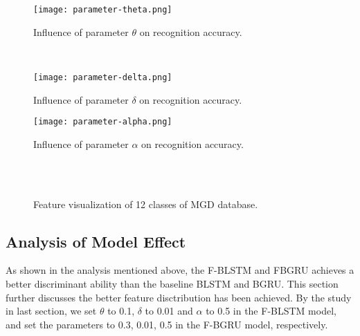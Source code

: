 \documentclass[review]{elsarticle}
\begin{document}
	\begin{figure*}[htp]
	\normalsize
	\begin{minipage}[t]{\linewidth}
		\centering
		\texttt{[image: parameter-theta.png]}
		\caption{Influence of parameter $\theta$ on recognition accuracy.}
		\label{fig:parameter-theta}
	\end{minipage}
	\hfill \\
	\begin{minipage}[h]{\linewidth}
		\centering
		\texttt{[image: parameter-delta.png]}
		\caption{Influence of parameter $\delta$ on recognition accuracy.}
		\label{fig:parameter-delta}
	\end{minipage}
	\hfill
\end{figure*}
\begin{figure*}[h]
	\normalsize
	\begin{minipage}[t]{\linewidth}
		\centering
		\texttt{[image: parameter-alpha.png]}
		\caption{Influence of parameter $\alpha$ on recognition accuracy.}
		\label{fig:parameter-alpha}
	\end{minipage}
\end{figure*}
\begin{figure*}[h]
	\normalsize
	\centering
	\\
	\\
	\caption{Feature visualization of 12 classes of MGD database.}
	\label{fig:featurevisualization}
	\vspace*{4pt}
\end{figure*}
\subsection{Analysis of Model Effect}\label{sec:discussion}
As shown in the analysis mentioned above, the F-BLSTM and FBGRU achieves a better discriminant ability than the baseline BLSTM and BGRU. This section further discusses the better feature disctribution has been achieved. By the study in last section, we set $\theta$ to 0.1, $\delta$ to 0.01 and $\alpha$ to 0.5 in the F-BLSTM model, and set the parameters to 0.3, 0.01, 0.5 in the F-BGRU model, respectively.
\end{document}
